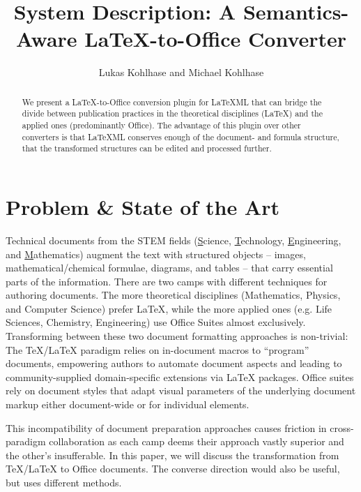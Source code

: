 \documentclass{llncs}
\title{System Description: A Semantics-Aware {\LaTeX}-to-Office Converter}
\author{Lukas Kohlhase and Michael Kohlhase}
\institute{Mathematics/Computer Science\\
  Jacobs University Bremen}
\def\latexml{{\LaTeX}ML\xspace}
\begin{document}
 
\maketitle
\begin{abstract}
  We present a {\LaTeX}-to-Office conversion plugin for \latexml that can bridge the
  divide between publication practices in the theoretical disciplines (\LaTeX) and the
  applied ones (predominantly Office). The advantage of this plugin over other converters
  is that \latexml conserves enough of the document- and formula structure, that the
  transformed structures can be edited and processed further.
\end{abstract}

\section{Problem \& State of the Art}\label{sec:intro}

Technical documents from the STEM fields (\underline{S}cience, \underline{T}echnology,
\underline{E}ngineering, and \underline{M}athematics) augment the text with structured
objects -- images, mathematical/chemical formulae, diagrams, and tables -- that carry
essential parts of the information. There are two camps with different techniques for
authoring documents. The more theoretical disciplines (Mathematics, Physics, and Computer
Science) prefer {\LaTeX}, while the more applied ones (e.g. Life Sciences, Chemistry,
Engineering) use Office Suites almost exclusively. Transforming between these two document
formatting approaches is non-trivial: The {\TeX/\LaTeX} paradigm relies on in-document
macros to ``program'' documents, empowering authors to automate document aspects and
leading to community-supplied domain-specific extensions via {\LaTeX} packages. Office
suites rely on document styles that adapt visual parameters of the underlying document
markup either document-wide or for individual elements.

This incompatibility of document preparation approaches causes friction in cross-paradigm
collaboration as each camp deems their approach vastly superior and the other's
insufferable. In this paper, we will discuss the transformation from {\TeX/\LaTeX} to
Office documents. The converse direction would also be useful, but uses different methods.
\end{document}
